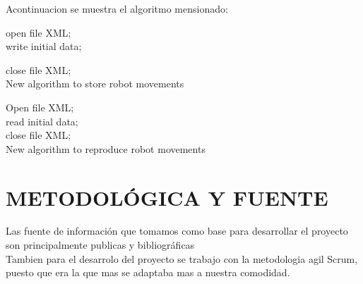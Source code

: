 \documentclass[letterpaper,12pt]{article}
\begin{document}
{Acontinuacion se muestra el algoritmo mensionado:\\

\begin{algorithm}[H]
	\BlankLine
	open file XML;\\
	write initial data;\\	
	
	close file XML;\\
	\caption{New algorithm to store robot movements }
\end{algorithm}


\begin{algorithm}[H]
	\BlankLine
	Open file XML;\\
	read initial data;\\ 
	close file XML;\\
	\caption{New algorithm to reproduce robot movements }
\end{algorithm}


\section{METODOLÓGICA Y FUENTE}


Las fuente de información que tomamos como base para desarrollar el proyecto son principalmente publicas y bibliográficas\\

Tambien para el desarrolo del proyecto se trabajo con la metodologia agil Scrum, puesto que era la que mas se adaptaba mas a nuestra comodidad.\\



}
\end{document}
